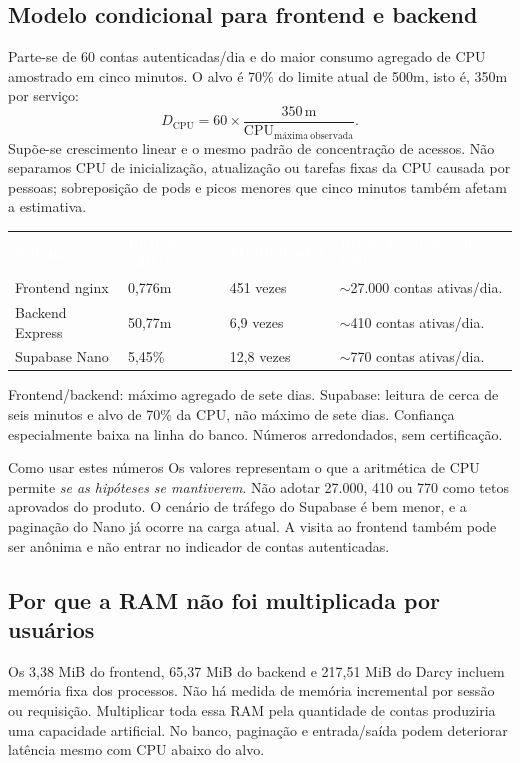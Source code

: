 \documentclass[10pt,a4paper]{article}
\newcommand{\smallnote}[1]{\par{\footnotesize\color{NFMuted}#1\par}}
\newcommand{\headcell}[1]{\textcolor{white}{\bfseries #1}}
\begin{document}
\subsection{Modelo condicional para frontend e backend}
Parte-se de 60 contas autenticadas/dia e do maior consumo agregado de CPU amostrado em cinco minutos. O alvo é 70\% do limite atual de 500m, isto é, 350m por serviço:
\[
D_{\mathrm{CPU}}=60\times\frac{350\,\mathrm{m}}{\mathrm{CPU}_{\mathrm{máxima\ observada}}}.
\]
Supõe-se crescimento linear e o mesmo padrão de concentração de acessos. Não separamos CPU de inicialização, atualização ou tarefas fixas da CPU causada por pessoas; sobreposição de pods e picos menores que cinco minutos também afetam a estimativa.

\begingroup\small\renewcommand{\arraystretch}{1.28}
\par\noindent\begin{tabularx}{\linewidth}{@{}L{31mm}R{29mm}R{26mm}Y@{}}
\headcell{Sistema}&\headcell{Pico de CPU}&\headcell{Multiplicador}&\headcell{Projeção apenas de CPU}\\
Frontend nginx&0,776m&451 vezes&\(\sim\)27.000 contas ativas/dia.\\
Backend Express&50,77m&6,9 vezes&\(\sim\)410 contas ativas/dia.\\
Supabase Nano&5,45\%&12,8 vezes&\(\sim\)770 contas ativas/dia.\\
\end{tabularx}\endgroup
\smallnote{Frontend/backend: máximo agregado de sete dias. Supabase: leitura de cerca de seis minutos e alvo de 70\% da CPU, não máximo de sete dias. Confiança especialmente baixa na linha do banco. Números arredondados, sem certificação.}

\begin{NFBox}{Como usar estes números}
Os valores representam o que a aritmética de CPU permite \emph{se as hipóteses se mantiverem}. Não adotar 27.000, 410 ou 770 como tetos aprovados do produto. O cenário de tráfego do Supabase é bem menor, e a paginação do Nano já ocorre na carga atual. A visita ao frontend também pode ser anônima e não entrar no indicador de contas autenticadas.
\end{NFBox}

\subsection{Por que a RAM não foi multiplicada por usuários}
Os 3,38 MiB do frontend, 65,37 MiB do backend e 217,51 MiB do Darcy incluem memória fixa dos processos. Não há medida de memória incremental por sessão ou requisição. Multiplicar toda essa RAM pela quantidade de contas produziria uma capacidade artificial. No banco, paginação e entrada/saída podem deteriorar latência mesmo com CPU abaixo do alvo.
\end{document}
